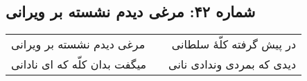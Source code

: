 \begin{center}
\section*{شماره ۴۲: مرغی دیدم نشسته بر ویرانی}
\label{sec:042}
\begin{longtable}{l p{0.5cm} r}
مرغی دیدم نشسته بر ویرانی
&&
در پیش گرفته کلّهٔ سلطانی
\\
میگفت بدان کلّه که ای نادانی
&&
دیدی که بمردی وندادی نانی
\\
\end{longtable}
\end{center}
